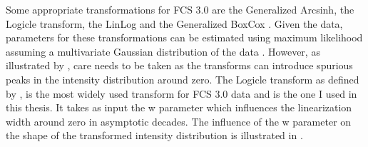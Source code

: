 Some appropriate transformations for FCS 3.0 are the Generalized Arcsinh, the Logicle transform,
the LinLog and the Generalized BoxCox \citep{Bagwell:2005he,Parks:2006gaa,Finak:2010is}.
Given the data, parameters for these transformations can be estimated using maximum likelihood assuming a multivariate Gaussian distribution of the data \citep{Finak:2010is}. 
However, as illustrated by \citet{Tung:2006uw}, care needs to be taken as the transforms can introduce spurious peaks in the intensity distribution around zero.
The Logicle transform as defined by \citet{Parks:2006gaa},
is the most widely used transform for FCS 3.0 data and is the one I used in this thesis.
It takes as input the w parameter which influences the linearization width around zero in asymptotic decades.
The influence of the w parameter on the shape of the transformed intensity distribution is illustrated in .
